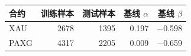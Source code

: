 \begin{tabular}{lrrrr}
\toprule
合约 & 训练样本 & 测试样本 & 基线 $\alpha$ & 基线 $\beta$ \\
\midrule
XAU & 2678 & 1395 & 0.197 & −0.598 \\
PAXG & 4317 & 2205 & 0.009 & −0.659 \\
\bottomrule
\end{tabular}

